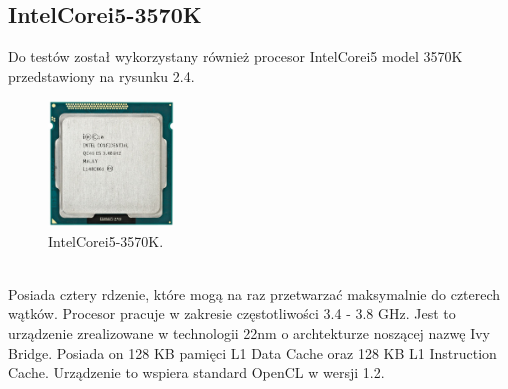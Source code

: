 \subsection{Intel\textregistered Core\texttrademark i5-3570K}
Do testów został wykorzystany również procesor Intel\textregistered Core\texttrademark i5 model 3570K przedstawiony na rysunku 2.4. 
\begin{figure}[h]
\centering
\includegraphics[width=0.3\textwidth]{figures/intel.jpg}
\caption{Intel\textregistered Core\texttrademark i5-3570K.}%
\label{rys:Intel Core i5-3570K}
\end{figure}
\\Posiada cztery rdzenie, które mogą na raz przetwarzać maksymalnie do czterech wątków. Procesor pracuje w zakresie częstotliwości 3.4 - 3.8 GHz. Jest to urządzenie zrealizowane w technologii 22nm o archtekturze noszącej nazwę Ivy Bridge. Posiada on 128 KB pamięci L1 Data Cache oraz 128 KB L1 Instruction Cache. Urządzenie to wspiera standard OpenCL w wersji 1.2.

